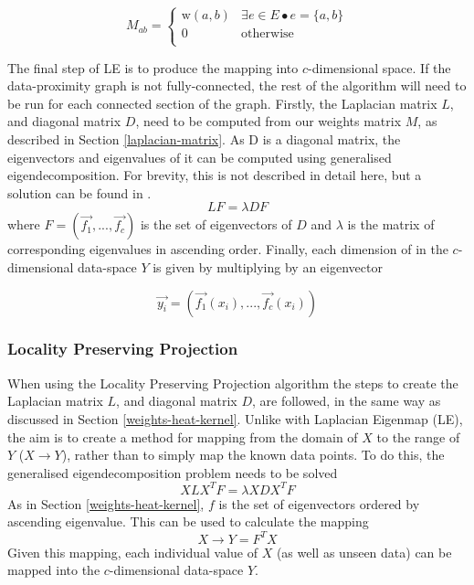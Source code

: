 \documentclass{article}
\begin{document}
\[M_{ab} = \left\{
\begin{array}{ll}
      \mathrm{w}(a, b) & \exists e \in E \bullet e = \{a, b\} \\
      0 & \mathrm{otherwise} \\
\end{array} 
\right.\]

The final step of LE is to produce the mapping into $c$-dimensional space. If the data-proximity graph is not fully-connected, the rest of the algorithm will need to be run for each connected section of the graph. Firstly, the Laplacian matrix $L$, and diagonal matrix $D$, need to be computed from our weights matrix $M$, as described in Section \ref{laplacian-matrix}. As D is a diagonal matrix, the eigenvectors and eigenvalues of it can be computed using generalised eigendecomposition. For brevity, this is not described in detail here, but a solution can be found in \cite[pp. 558 - 563]{engineering-mathematics}.
\[LF = \lambda DF\]
where $F = (\vec{f_1}, ..., \vec{f_c})$ is the set of eigenvectors of $D$ and $\lambda$ is the matrix of corresponding eigenvalues in ascending order. Finally, each dimension of in the $c$-dimensional data-space $Y$ is given by multiplying by an eigenvector

\[\vec{y_i} = (\vec{f_1}(x_i), ..., \vec{f_c}(x_i))\]

\subsubsection{Locality Preserving Projection}
When using the Locality Preserving Projection algorithm the steps to create the Laplacian matrix $L$, and diagonal matrix $D$, are followed, in the same way as discussed in Section \ref{weights-heat-kernel}. Unlike with Laplacian Eigenmap (LE), the aim is to create a method for mapping from the domain of $X$ to the range of $Y$ ($X \rightarrow Y$), rather than to simply map the known data points. To do this, the generalised eigendecomposition problem\cite[pp. 558 - 563]{engineering-mathematics} needs to be solved
\[XLX^TF = \lambda XDX^TF\]
As in Section \ref{weights-heat-kernel}, $f$ is the set of eigenvectors ordered by ascending eigenvalue. This can be used to calculate the mapping
\[X\rightarrow Y = F^TX\]
Given this mapping, each individual value of $X$ (as well as unseen data) can be mapped into the $c$-dimensional data-space $Y$.
\end{document}
